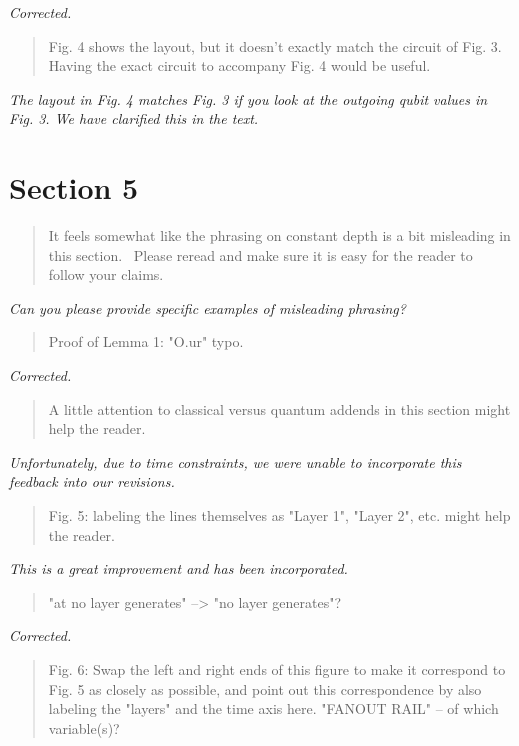 \documentclass{article}
\theoremstyle{plain} \newtheorem{lemma}{Lemma}
\begin{document}
{\it Corrected.}

\begin{quote}
Fig. 4 shows the layout, but it doesn't exactly match the circuit of
Fig. 3.  Having the exact circuit to accompany Fig. 4 would be useful.
\end{quote}

{\it The layout in Fig. 4 matches Fig. 3 if you look at the outgoing qubit values in Fig. 3.  We have clarified this in the text.}

\section{Section 5}

\begin{quote}
It feels somewhat like the phrasing on constant depth is a bit
misleading in this section.  Please reread and make sure it is easy
for the reader to follow your claims.
\end{quote}

{\it Can you please provide specific examples of misleading phrasing?}

\begin{quote}
Proof of Lemma 1: "O.ur" typo.
\end{quote}

{\it Corrected.}

\begin{quote}
A little attention to classical versus quantum addends in this section
might help the reader.
\end{quote}

{\it Unfortunately, due to time constraints, we were unable to incorporate this feedback into our revisions.}

\begin{quote}
Fig. 5: labeling the lines themselves as "Layer 1", "Layer 2",
etc. might help the reader.
\end{quote}

{\it This is a great improvement and has been incorporated.}

\begin{quote}
"at no layer generates" --> "no layer generates"?
\end{quote}

{\it Corrected.}

\begin{quote}
Fig. 6: Swap the left and right ends of this figure to make it
correspond to Fig. 5 as closely as possible, and point out this
correspondence by also labeling the "layers" and the time axis here.
"FANOUT RAIL" -- of which variable(s)?
\end{quote}
\end{document}
